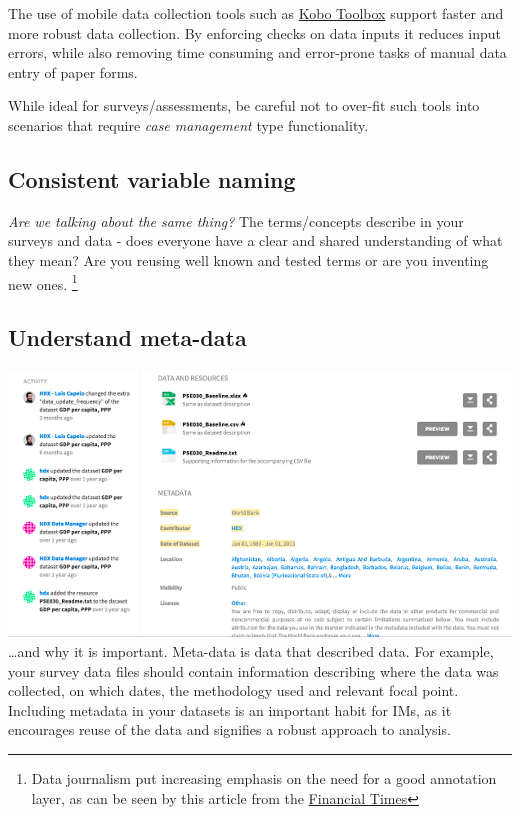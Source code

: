 \documentclass[
  a4paper,
  onecolumn,
  oneside]{book}
\begin{document}
The use of mobile data collection tools such as
\href{https://kobo.humanitarianresponse.info/}{Kobo Toolbox} support
faster and more robust data collection. By enforcing checks on data
inputs it reduces input errors, while also removing time consuming and
error-prone tasks of manual data entry of paper forms.

While ideal for surveys/assessments, be careful not to over-fit such
tools into scenarios that require \emph{case management} type
functionality.

\hypertarget{consistent-variable-naming}{%
\subsection{Consistent variable
naming}\label{consistent-variable-naming}}

\emph{Are we talking about the same thing?} The terms/concepts describe
in your surveys and data - does everyone have a clear and shared
understanding of what they mean? Are you reusing well known and tested
terms or are you inventing new ones. \footnote{Data journalism put
  increasing emphasis on the need for a good annotation layer, as can be
  seen by this article from the
  \href{https://www.ft.com/content/4743ce96-e4bf-11e7-97e2-916d4fbac0da}{Financial
  Times}}

\hypertarget{understand-meta-data}{%
\subsection{Understand meta-data}\label{understand-meta-data}}

\includegraphics{part1/./images/metadata.png}\\
\ldots and why it is important. Meta-data is data that described data.
For example, your survey data files should contain information
describing where the data was collected, on which dates, the methodology
used and relevant focal point. Including metadata in your datasets is an
important habit for IMs, as it encourages reuse of the data and
signifies a robust approach to analysis.
\end{document}

